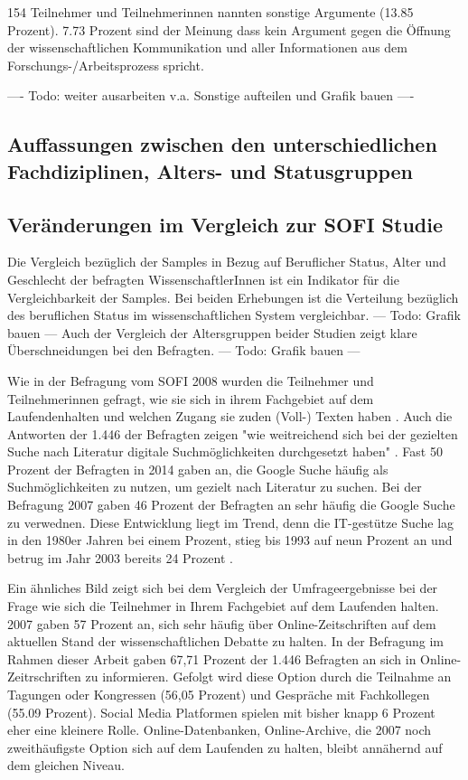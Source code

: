 154 Teilnehmer und Teilnehmerinnen nannten sonstige Argumente (13.85 Prozent). 7.73 Prozent sind der Meinung dass kein Argument gegen die Öffnung der wissenschaftlichen Kommunikation und aller Informationen aus dem Forschungs-/Arbeitsprozess spricht.

---- Todo: weiter ausarbeiten v.a. Sonstige aufteilen und Grafik bauen ----

\subsection{Auffassungen zwischen den unterschiedlichen Fachdiziplinen, Alters- und Statusgruppen}



\subsection{Veränderungen im Vergleich zur SOFI Studie}

Die Vergleich bezüglich der Samples in Bezug auf Beruflicher Status, Alter und Geschlecht der befragten WissenschaftlerInnen ist ein Indikator für die Vergleichbarkeit der Samples. Bei beiden Erhebungen ist die Verteilung bezüglich des beruflichen Status im wissenschaftlichen System vergleichbar.
--- Todo: Grafik bauen --- 
Auch der Vergleich der Altersgruppen beider Studien zeigt klare Überschneidungen bei den Befragten.  --- Todo: Grafik bauen --- 

Wie in der Befragung vom SOFI 2008 wurden die Teilnehmer und Teilnehmerinnen gefragt, wie sie sich in ihrem Fachgebiet auf dem Laufendenhalten und welchen Zugang sie zuden (Voll-) Texten haben \cite{hanekop_2008}. Auch die Antworten der 1.446 der Befragten zeigen "wie weitreichend sich bei der gezielten Suche nach Literatur digitale Suchmöglichkeiten durchgesetzt haben" \cite{hanekop_2008}. Fast 50 Prozent der Befragten in 2014 gaben an, die Google Suche häufig als Suchmöglichkeiten zu nutzen, um gezielt nach Literatur zu suchen. Bei der Befragung 2007 gaben 46 Prozent der Befragten an sehr häufig die Google Suche zu verwednen. Diese Entwicklung liegt im Trend, denn die IT-gestütze Suche lag in den 1980er Jahren bei einem Prozent, stieg bis 1993 auf neun Prozent an und betrug im Jahr 2003 bereits 24 Prozent \cite{hanekop_2008}.

Ein ähnliches Bild zeigt sich bei dem Vergleich der Umfrageergebnisse bei der Frage wie sich die Teilnehmer in Ihrem Fachgebiet auf dem Laufenden halten. 2007 gaben 57 Prozent an, sich sehr häufig über Online-Zeitschriften auf dem aktuellen Stand der wissenschaftlichen Debatte zu halten. In der Befragung im Rahmen dieser Arbeit gaben 67,71 Prozent der 1.446 Befragten an sich in Online-Zeitrschriften zu informieren. Gefolgt wird diese Option durch die Teilnahme an Tagungen oder Kongressen (56,05 Prozent) und Gespräche mit Fachkollegen (55.09 Prozent). Social Media Platformen spielen mit bisher knapp 6 Prozent eher eine kleinere Rolle. Online-Datenbanken, Online-Archive, die 2007 noch zweithäufigste Option sich auf dem Laufenden zu halten, bleibt annähernd auf dem gleichen Niveau.

